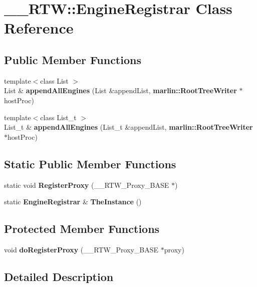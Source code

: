 \section{\_\-\_\-RTW::EngineRegistrar Class Reference}
\label{class____RTW_1_1EngineRegistrar}
\subsection*{Public Member Functions}
\begin{DoxyCompactItemize}
\item 
{\footnotesize template$<$class List $>$ }\\List \& {\bfseries appendAllEngines} (List \&appendList, {\bf marlin::RootTreeWriter} $\ast$hostProc)\label{class____RTW_1_1EngineRegistrar_a37b3e9aa3188c24cada30ff179da1caa}

\item 
{\footnotesize template$<$class List\_\-t $>$ }\\List\_\-t \& {\bf appendAllEngines} (List\_\-t \&appendList, {\bf marlin::RootTreeWriter} $\ast$hostProc)
\end{DoxyCompactItemize}
\subsection*{Static Public Member Functions}
\begin{DoxyCompactItemize}
\item 
static void {\bfseries RegisterProxy} (\_\-\_\-RTW\_\-Proxy\_\-BASE $\ast$)\label{class____RTW_1_1EngineRegistrar_adf6c4241c68c96af4ca04a7807206019}

\item 
static {\bf EngineRegistrar} \& {\bfseries TheInstance} ()\label{class____RTW_1_1EngineRegistrar_a6d306ec70b08a954acea55fcf12af46e}

\end{DoxyCompactItemize}
\subsection*{Protected Member Functions}
\begin{DoxyCompactItemize}
\item 
void {\bf doRegisterProxy} (\_\-\_\-RTW\_\-Proxy\_\-BASE $\ast$proxy)
\end{DoxyCompactItemize}


\subsection{Detailed Description}



